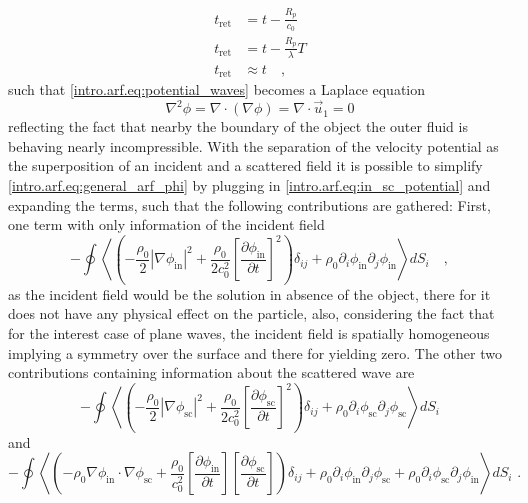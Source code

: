 \begin{align}
    t_{\text{ret}} &= t - \frac{R_p}{c_0} \nonumber\\
    t_{\text{ret}} &= t - \frac{R_p}{\lambda}T \nonumber\\
    t_{\text{ret}} &\approx t\quad,\label{intro.arf.eq:t_ret_approx}
\end{align}
such that \eqref{intro.arf.eq:potential_waves} becomes a Laplace equation
\begin{equation}\label{intro.arf.eq:laplace_potential}
    \nabla^2\phi = \nabla\cdot(\nabla\phi) = \nabla\cdot\vec u_1 = 0
\end{equation}
reflecting the fact that nearby the boundary of the object the outer fluid is behaving nearly incompressible. With the separation of the velocity potential as the superposition of an incident and a scattered field it is possible to simplify \eqref{intro.arf.eq:general_arf_phi} by plugging in \eqref{intro.arf.eq:in_sc_potential} and expanding the terms, such that the following contributions are gathered: First, one term with only information of the incident field
\begin{equation}\label{intro.arf.eq:force_in_in}
    -\oint\left\langle\left(-\frac{\rho_0}{2}|\nabla\phi_{\text{in}}|^2 + \frac{\rho_0}{2c_0^2}\left[\frac{\partial\phi_{\text{in}}}{\partial t}\right]^2\right)\delta_{ij} + \rho_0\partial_i\phi_{\text{in}}\partial_j\phi_{\text{in}}\right\rangle dS_i\quad,
\end{equation}
as the incident field would be the solution in absence of the object, there for it does not have any physical effect on the particle, also, considering the fact that for the interest case of plane waves, the incident field is spatially homogeneous implying a symmetry over the surface and there for yielding zero. The other two contributions containing information about the scattered wave are
\begin{equation}\label{intro.arf.eq:force_sc_sc}
    -\oint\left\langle\left(-\frac{\rho_0}{2}|\nabla\phi_{\text{sc}}|^2 + \frac{\rho_0}{2c_0^2}\left[\frac{\partial\phi_{\text{sc}}}{\partial t}\right]^2\right)\delta_{ij} + \rho_0\partial_i\phi_{\text{sc}}\partial_j\phi_{\text{sc}}\right\rangle dS_i
\end{equation}
and
\begin{equation}\label{intro.arf.eq:force_in_sc}
    -\oint\left\langle\left(-\rho_0\nabla\phi_{\text{in}}\cdot\nabla\phi_{\text{sc}} + \frac{\rho_0}{c_0^2}\left[\frac{\partial\phi_{\text{in}}}{\partial t}\right]\left[\frac{\partial\phi_{\text{sc}}}{\partial t}\right]\right)\delta_{ij} + \rho_0\partial_i\phi_{\text{in}}\partial_j\phi_{\text{sc}} + \rho_0\partial_i\phi_{\text{sc}}\partial_j\phi_{\text{in}}\right\rangle dS_i\text{ .}
\end{equation}
